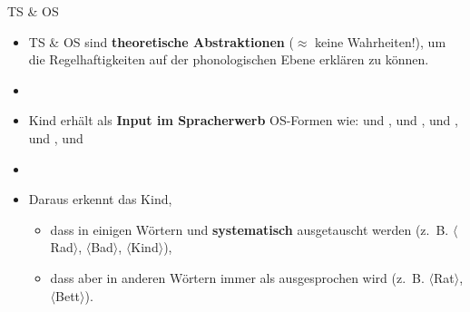 \begin{frame}{TS \& OS}

\begin{itemize}
	\item TS \& OS sind \textbf{theoretische Abstraktionen} ($\approx$ keine Wahrheiten!), um die Regelhaftigkeiten auf der phonologischen Ebene erklären zu können.
	\item[]
	\item Kind erhält als \textbf{Input im Spracherwerb} OS-Formen wie: \textipa{[\;R a: t]} und \textipa{[\;R E: t @]}, \textipa{[\;R a: t]} und \textipa{[\;R E: d 5]}, \textipa{[b E t]} und \textipa{[b E t @ n]}, \textipa{[b a: t]} und \textipa{[b E: d 5]}, \textipa{[k I n t]} und \textipa{[k I n d 5]}
	\item[]
	\item Daraus erkennt das Kind,

	\begin{itemize}
		\item dass in einigen Wörtern \textipa{[d]} und \textipa{[t]} \textbf{systematisch} ausgetauscht werden (z.~B. $\langle$Rad$\rangle$, $\langle$Bad$\rangle$, $\langle$Kind$\rangle$),
		\item dass aber in anderen Wörtern \textipa{[t]} immer als \textipa{[t]} ausgesprochen wird  (z.~B. $\langle$Rat$\rangle$, $\langle$Bett$\rangle$).
	\end{itemize}
		
\end{itemize}

\end{frame}




